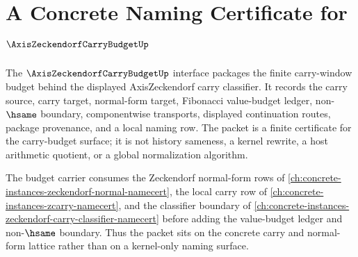 \chapter{A Concrete Naming Certificate for $\AxisZeckendorfCarryBudgetUp$}
\label{ch:concrete-instances-axiszeckendorfcarrybudget-namecert}

The $\AxisZeckendorfCarryBudgetUp$ interface packages the finite carry-window budget behind the displayed AxisZeckendorf carry classifier. It records the carry source, carry target, normal-form target, Fibonacci value-budget ledger, non-$\hsame$ boundary, componentwise transports, displayed continuation routes, package provenance, and a local naming row. The packet is a finite certificate for the carry-budget surface; it is not history sameness, a kernel rewrite, a host arithmetic quotient, or a global normalization algorithm.

The budget carrier consumes the Zeckendorf normal-form rows of \autoref{ch:concrete-instances-zeckendorf-normal-namecert}, the local carry row of \autoref{ch:concrete-instances-zcarry-namecert}, and the classifier boundary of \autoref{ch:concrete-instances-zeckendorf-carry-classifier-namecert} before adding the value-budget ledger and non-$\hsame$ boundary. Thus the packet sits on the concrete carry and normal-form lattice rather than on a kernel-only naming surface.

